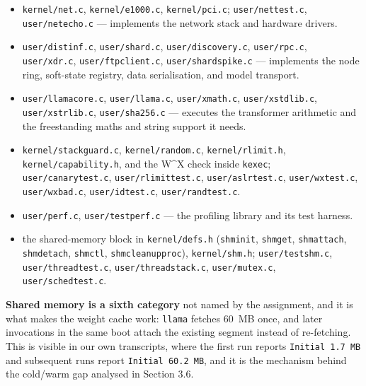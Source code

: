\documentclass[11pt]{article}
\renewcommand{\_}{\origunderscore\allowbreak}
\begin{document}
\begin{itemize}[leftmargin=3.8cm, labelsep=6pt, itemsep=4pt, font=\normalfont\bfseries]
\item[Networking] \texttt{kernel/net.c}, \texttt{kernel/e1000.c}, \texttt{kernel/pci.c}; \texttt{user/nettest.c}, \texttt{user/netecho.c} --- implements the network stack and hardware drivers.
\item[Distributed Inference] \texttt{user/distinf.c}, \texttt{user/shard.c}, \texttt{user/discovery.c}, \texttt{user/rpc.c}, \texttt{user/xdr.c}, \texttt{user/ftpclient.c}, \texttt{user/shardspike.c} --- implements the node ring, soft-state registry, data serialisation, and model transport.
\item[Model Computation] \texttt{user/llama\_core.c}, \texttt{user/llama.c}, \texttt{user/xmath.c}, \texttt{user/xstdlib.c}, \texttt{user/xstrlib.c}, \texttt{user/sha256.c} --- executes the transformer arithmetic and the freestanding maths and string support it needs.
\item[Hardening] \texttt{kernel/\allowbreak{}stackguard.c}, \texttt{kernel/random.c}, \texttt{kernel/rlimit.h}, \texttt{kernel/\allowbreak{}capability.h}, and the W\^{}X check inside \texttt{kexec}; \texttt{user/\allowbreak{}canarytest.c}, \texttt{user/\allowbreak{}rlimittest.c}, \texttt{user/aslrtest.c}, \texttt{user/wxtest.c}, \texttt{user/wxbad.c}, \texttt{user/idtest.c}, \texttt{user/randtest.c}.
\item[Measurement] \texttt{user/perf.c}, \texttt{user/testperf.c} --- the profiling library and its test harness.
\item[Shared Memory \& Threading] the shared-memory block in \texttt{kernel/\allowbreak{}defs.h} (\texttt{shm\_init}, \texttt{shm\_get}, \texttt{shm\_attach}, \texttt{shm\_detach}, \texttt{shmctl}, \texttt{shm\_cleanup\_proc}), \texttt{kernel/\allowbreak{}shm.h}; \texttt{user/\allowbreak{}testshm.c}, \texttt{user/\allowbreak{}threadtest.c}, \texttt{user/\allowbreak{}threadstack.c}, \texttt{user/mutex.c}, \texttt{user/\allowbreak{}schedtest.c}.
\end{itemize}

\textbf{Shared memory is a sixth category} not named by the assignment, and it is what makes the weight cache work: \texttt{llama} fetches 60~MB once, and later invocations in the same boot attach the existing segment instead of re-fetching. This is visible in our own transcripts, where the first run reports \texttt{Initial 1.7 MB} and subsequent runs report \texttt{Initial 60.2 MB}, and it is the mechanism behind the cold/warm gap analysed in Section 3.6.
\end{document}
